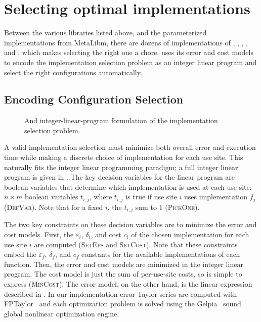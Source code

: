 \documentclass[paper.tex]{subfiles}
\begin{document}
\section{Selecting optimal implementations}
\label{sec:optimization}

Between the various libraries listed above,
  and the parameterized implementations from MetaLibm,
  there are dozens of implementations
  of , , , , and ,
  which makes selecting the right one a chore.
\name uses its error and cost models
  to encode the implementation selection problem
  as an integer linear program
  and select the right configurations automatically.

\subsection{Encoding Configuration Selection}

\begin{figure}
\newcommand{\eqnbox}[1]{\fbox{\textsc{#1}}\;}
\caption{And integer-linear-program formulation of the implementation
  selection problem.}
\label{fig:ilp-form}
\end{figure}

A valid implementation selection
  must minimize both overall error and execution time
  while making a discrete choice of implementation for each use site.
This naturally fits the integer linear programming paradigm;
  a full integer linear program is given in .
The key decision variables for the linear program
  are boolean variables that determine
  which implementation is used at each use site:
  $n \times m$ boolean variables $t_{i,j}$,
  where $t_{i,j}$ is true if use site $i$ uses implementation $f_j$
  (\textsc{DefVar}).
Note that for a fixed $i$, the $t_{i,j}$ sum to 1 (\textsc{PickOne}).

The two key constraints on these decision variables
  are to minimize the error and cost models.
First, the $\varepsilon_i$, $\delta_i$, and cost $c_i$
  of the chosen implementation for each use site $i$
  are computed (\textsc{SetEps} and \textsc{SetCost}).
Note that these constraints embed
  the $\varepsilon_f$, $\delta_f$, and $c_f$ constants
  for the available implementations of each function.
Then, the error and cost models are minimized
  in the integer linear program.
The cost model is just the sum of per-use-site costs,
  so is simple to express (\textsc{MinCost}).
The error model, on the other hand,
  is the linear expression described in .
In our implementation
  error Taylor series are computed
  with FPTaylor~\cite{fptaylor}
  and each optimization problem is solved
  using the Gelpia~\cite{gelpia}
  sound global nonlinear optimization engine.
\end{document}
